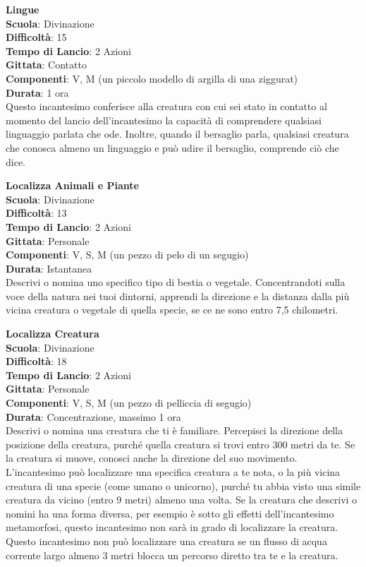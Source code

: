 \begin{multicols}{2}
\medskip\textbf{Lingue}\\
\textbf{Scuola}: Divinazione\\
\textbf{Difficoltà}: 15\\
\textbf{Tempo di Lancio}: 2 Azioni\\
\textbf{Gittata}: Contatto\\
\textbf{Componenti}: V, M (un piccolo modello di argilla di una ziggurat)\\
\textbf{Durata}: 1 ora\\
Questo incantesimo conferisce alla creatura con cui sei stato in contatto al momento del lancio dell'incantesimo la capacità di comprendere qualsiasi linguaggio parlata che ode. Inoltre, quando il bersaglio parla, qualsiasi creatura che conosca almeno un linguaggio e può udire il bersaglio, comprende ciò che dice.

\medskip\textbf{Localizza Animali e Piante}\\
\textbf{Scuola}: Divinazione\\
\textbf{Difficoltà}: 13\\
\textbf{Tempo di Lancio}: 2 Azioni\\
\textbf{Gittata}: Personale\\
\textbf{Componenti}: V, S, M (un pezzo di pelo di un segugio) \\
\textbf{Durata}: Istantanea\\
Descrivi o nomina uno specifico tipo di bestia o vegetale. Concentrandoti sulla voce della natura nei tuoi dintorni, apprendi la direzione e la distanza dalla più vicina creatura o vegetale di quella specie, se ce ne sono entro 7,5 chilometri.

\medskip\textbf{Localizza Creatura}\\
\textbf{Scuola}: Divinazione\\
\textbf{Difficoltà}: 18\\
\textbf{Tempo di Lancio}: 2 Azioni\\
\textbf{Gittata}: Personale\\
\textbf{Componenti}: V, S, M (un pezzo di pelliccia di segugio)\\
\textbf{Durata}: Concentrazione, massimo 1 ora\\
Descrivi o nomina una creatura che ti è familiare. Percepisci la direzione della posizione della creatura, purché quella creatura si trovi entro 300 metri da te. Se la creatura si muove, conosci anche la direzione del suo movimento.\\
L'incantesimo può localizzare una specifica creatura a te nota, o la più vicina creatura di una specie (come umano o unicorno), purché tu abbia visto una simile creatura da vicino (entro 9 metri) almeno una volta. Se la creatura che descrivi o nomini ha una forma diversa, per esempio è sotto gli effetti dell'incantesimo metamorfosi, questo incantesimo non sarà in grado di localizzare la creatura.\\
Questo incantesimo non può localizzare una creatura se un flusso di acqua corrente largo almeno 3 metri blocca un percorso diretto tra te e la creatura.


\end{multicols}
